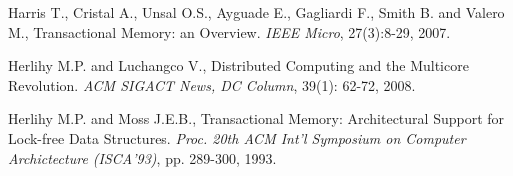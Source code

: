 \begin{thebibliography}{99}
{%



Harris T., Cristal  A., Unsal O.S., Ayguade E., Gagliardi  F., Smith B. and
Valero M., 
Transactional Memory: an Overview. 
{\it IEEE Micro}, 27(3):8-29, 2007. 


% 
% 






Herlihy M.P.  and Luchangco V.,
Distributed Computing and the Multicore Revolution.
{\it ACM SIGACT News, DC Column}, 39(1): 62-72, 2008.






Herlihy M.P.  and Moss J.E.B., 
Transactional Memory: Architectural Support for Lock-free Data Structures. 
{\it Proc. 20th ACM Int'l Symposium  on Computer Archictecture (ISCA'93)}, 
pp. 289-300, 1993. 


}
\end{thebibliography}
